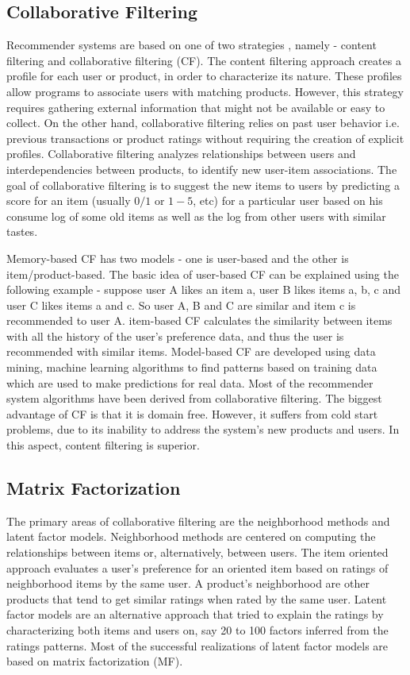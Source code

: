\documentclass{article} %
\begin{document}
\subsection{Collaborative Filtering}
Recommender systems are based on one of two strategies \cite{ATTPaper2009}, namely - content filtering and collaborative filtering (CF). The content filtering approach creates a profile for each user or product, in order to characterize its nature. These profiles allow programs to associate users with matching products. However, this strategy requires gathering external information that might not be available or easy to collect. On the other hand, collaborative filtering relies on past user behavior i.e. previous transactions or product ratings without requiring the creation of explicit profiles. Collaborative filtering analyzes relationships between users and interdependencies between products, to identify new user-item associations. The goal of collaborative filtering is to suggest the new items to users by predicting a score for an item (usually $0/1$ or $1-5$, etc) for a particular user based on his consume log of some old items as well as the log from other users with similar tastes.

Memory-based CF has two models - one is user-based and the other is item/product-based. The basic idea of user-based CF can be explained using the following example - suppose user A likes an item a, user B likes items a, b, c and user C likes items a and c. So user A, B and C are similar and item c is recommended to user A. item-based CF calculates the similarity between items with all the history of the user's preference data, and thus the user is recommended with similar items. Model-based CF are developed using data mining, machine learning algorithms to find patterns based on training data which are used to make predictions for real data. Most of the recommender system algorithms have been derived from collaborative filtering. The biggest advantage of CF is that it is domain free. However, it suffers from cold start problems, due to its inability to address the system's new products and users. In this aspect, content filtering is superior.

\subsection{ Matrix Factorization }
The primary areas of collaborative filtering \cite{ATTPaper2009} are the neighborhood methods and latent factor models. Neighborhood methods are centered on computing the relationships between items or, alternatively, between users. The item oriented approach evaluates a user's preference for an oriented item based on ratings of neighborhood items by the same user. A product's neighborhood are other products that tend to get similar ratings when rated by the same user. Latent factor models are an alternative approach that tried to explain the ratings by characterizing both items and users on, say 20 to 100 factors inferred from the ratings patterns. Most of the successful realizations of latent factor models are based on matrix factorization (MF).
\end{document}

